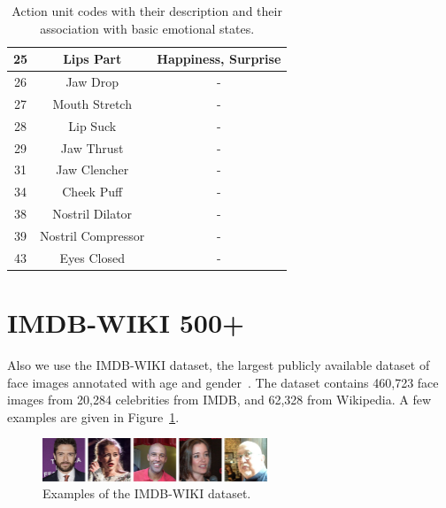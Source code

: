 \begin{table}[]
\begin{tabular}{c|c|c}
25          & Lips Part            & Happiness, Surprise              \\ \hline
26          & Jaw Drop             & -                                \\ \hline
27          & Mouth Stretch        & -                                \\ \hline
28          & Lip Suck             & -                                \\ \hline
29          & Jaw Thrust           & -                                \\ \hline
31          & Jaw Clencher         & -                                \\ \hline
34          & Cheek Puff           & -                                \\ \hline
38          & Nostril Dilator      & -                                \\ \hline
39          & Nostril Compressor   & -                                \\ \hline
43          & Eyes Closed          & -                                \\ \hline
\end{tabular}
\caption{Action unit codes with their description and their association with basic emotional states.}
\label{tab:AU}
\end{table}

\section{IMDB-WIKI 500+}
Also we use the IMDB-WIKI dataset, the largest publicly available dataset of face images annotated with age and gender~\cite{rothe2015dex}. The dataset contains 460,723 face images from 20,284 celebrities from IMDB, and 62,328 from Wikipedia. A few examples are given in Figure~\ref{fig:wiki}.

 \begin{figure}[H]
    \begin{center}
    \includegraphics[width=0.6\textwidth]{images/wiki.png}
    \end{center}
    \caption{Examples of the IMDB-WIKI dataset.} \label{fig:wiki}
\end{figure}

